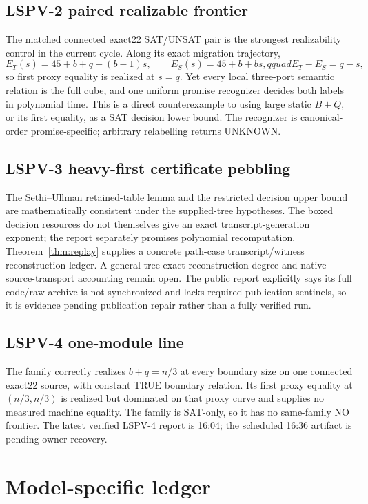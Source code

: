 \documentclass[11pt]{article}
\begin{document}
\subsection{LSPV-2 paired realizable frontier}

The matched connected exact22 SAT/UNSAT pair is the strongest realizability control in the current
cycle.  Along its exact migration trajectory,
\[
E_T(s)=45+b+q+(b-1)s,\qquad E_S(s)=45+b+bs,qquad E_T-E_S=q-s,
\]
so first proxy equality is realized at $s=q$.  Yet every local three-port semantic relation is the
full cube, and one uniform promise recognizer decides both labels in polynomial time.  This is a
direct counterexample to using large static $B+Q$, or its first equality, as a SAT decision lower
bound.  The recognizer is canonical-order promise-specific; arbitrary relabelling returns UNKNOWN.

\subsection{LSPV-3 heavy-first certificate pebbling}

The Sethi--Ullman retained-table lemma and the restricted decision upper bound are mathematically
consistent under the supplied-tree hypotheses.  The boxed decision resources do not themselves give
an exact transcript-generation exponent; the report separately promises polynomial recomputation.
Theorem~\ref{thm:replay} supplies a concrete path-case transcript/witness reconstruction ledger.  A
general-tree exact reconstruction degree and native source-transport accounting remain open.  The
public report explicitly says its full code/raw archive is not synchronized and lacks required
publication sentinels, so it is evidence pending publication repair rather than a fully verified run.

\subsection{LSPV-4 one-module line}

The family correctly realizes $b+q=n/3$ at every boundary size on one connected exact22 source, with
constant TRUE boundary relation.  Its first proxy equality at $(n/3,n/3)$ is realized but dominated
on that proxy curve and supplies no measured machine equality.  The family is SAT-only, so it has no
same-family NO frontier.  The latest verified LSPV-4 report is 16:04; the scheduled 16:36 artifact is
pending owner recovery.

\section{Model-specific ledger}
\end{document}
